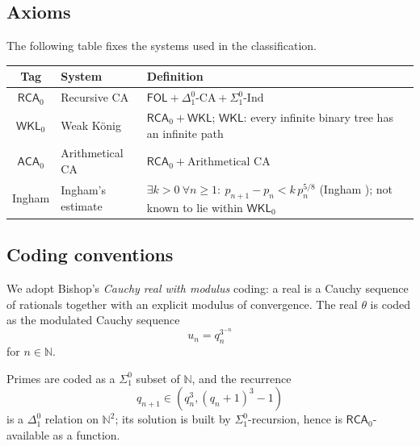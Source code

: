 \documentclass[11pt,reqno]{amsart}
\providecommand{\N}{\mathbb{N}}
\theoremstyle{redplain}
\numberwithin{equation}{section}
\begin{document}
\subsection{Axioms}

\label{sec:axioms-table}

The following table fixes the systems used in the classification.

\begin{center}
{\small 
\begin{tabular}{|c|m{2.0cm}|m{9.0cm}|}
\hline
\textbf{Tag} & \textbf{System} & \textbf{Definition} \\ \hline
$\mathsf{RCA}_0$ & Recursive CA & $\mathsf{FOL}+\Delta^0_1\text{-CA}%
+\Sigma^0_1\text{-Ind}$ \\ \hline
$\mathsf{WKL}_0$ & Weak K\"onig & $\mathsf{RCA}_0+\mathsf{WKL}$; $\mathsf{WKL%
}$: every infinite binary tree has an infinite path \\ \hline
$\mathsf{ACA}_0$ & Arithmetical CA & $\mathsf{RCA}_0+\text{Arithmetical CA}$
\\ \hline
Ingham & Ingham's estimate & $\exists k>0\ \forall n\ge1:\
p_{n+1}-p_n<k\,p_n^{5/8}$ (Ingham \cite{Ingham1937}); not known to lie
within $\mathsf{WKL}_0$ \\ \hline
\end{tabular}
}
\end{center}

\subsection{Coding conventions}

\label{sec:coding}

\noindent We adopt Bishop's \emph{Cauchy real with modulus} coding: a real
is a Cauchy sequence of rationals together with an explicit modulus of
convergence. The real $\theta $ is coded as the modulated Cauchy sequence%
\begin{equation}
u_{n}=q_{n}^{3^{-n}}
\end{equation}
for $n\in \N$.

\noindent%
Primes are coded as a $\Sigma _{1}^{0}$ subset of $\N$, and the recurrence 
\begin{equation}
q_{n+1}\in (q_{n}^{3},(q_{n}+1)^{3}-1)
\end{equation}
is a $\Delta _{1}^{0}$ relation on $\N^{2}$; its solution is built by $%
\Sigma _{1}^{0}$-recursion, hence is $\mathsf{RCA}_{0}$-available as a
function.
\end{document}
